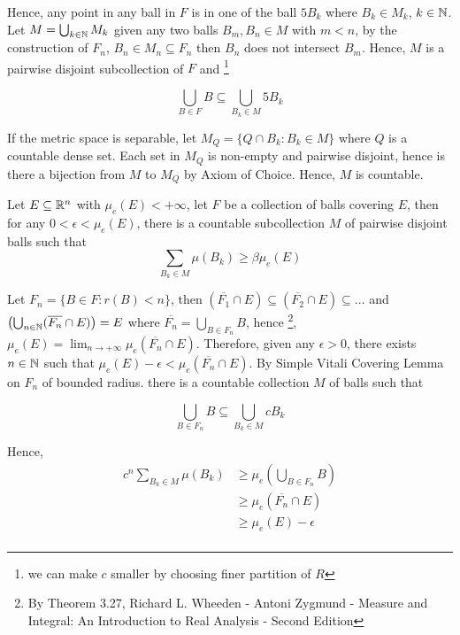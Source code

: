 \documentclass{report}
\begin{document}
Hence, any point in any ball in $F$ is in one of the ball $5 B_k $ where $B_k \in M_k$, $k \in \mathbb{N}$. Let $M = \bigcup_{k \in \mathbb{N}} M_k$ given any two balls $B_m, B_n \in M$ with $m < n$, by the construction of $F_n$, $B_n \in M_n \subseteq F_n$ then $B_n$ does not intersect $B_m$. Hence, $M$ is a pairwise disjoint subcollection of $F$ and \footnote{we can make $c$ smaller by choosing finer partition of $R$}

\[
    \bigcup_{B \in F} B \subseteq \bigcup_{B_k \in M} 5B_k
\]

If the metric space is separable, let $M_Q = \{ Q \cap B_k: B_k \in M \}$ where $Q$ is a countable dense set. Each set in $M_Q$ is non-empty and pairwise disjoint, hence is there a bijection from $M$ to $M_Q$ by Axiom of Choice. Hence, $M$ is countable.

\begin{lemma}
    Let $E \subseteq \mathbb{R}^n$ with $\mu_e(E) < +\infty$, let $F$ be a collection of balls covering $E$, then for any $0 < \epsilon < \mu_e(E)$, there is a countable subcollection $M$ of pairwise disjoint balls such that
    \[
        \sum_{B_k \in M} \mu(B_k) \geq \beta \mu_e(E)
    \]

    
\end{lemma}
Let $F_n = \{B \in F: r(B) < n\}$, then $(\overline{F_1} \cap E) \subseteq (\overline{F_2} \cap E) \subseteq ...$ and $\left( \bigcup_{n \in \mathbb{N}} (\overline{F_n} \cap E) \right) = E$ where $\overline{F_n} = \bigcup_{B \in F_n} B$, hence \footnote{By Theorem 3.27, Richard L. Wheeden - Antoni Zygmund - Measure and Integral: An Introduction to Real Analysis - Second Edition}, $\mu_e(E) = \lim_{n \to +\infty} \mu_e(\overline{F_n} \cap E)$. Therefore, given any $\epsilon > 0$, there exists $n \in \mathbb{N}$ such that $\mu_e(E) - \epsilon < \mu_e(\overline{F_n} \cap E)$. By Simple Vitali Covering Lemma on $F_n$ of bounded radius. there is a countable collection $M$ of balls such that

\[
    \bigcup_{B \in F_n} B \subseteq \bigcup_{B_k \in M} cB_k
\]

Hence, 
\begin{align*}
    c^n \sum_{B_k \in M} \mu(B_k)
    &\geq \mu_e\left(\bigcup_{B \in F_n} B \right) \\
    &\geq \mu_e(\overline{F_n} \cap E) \\
    &\geq \mu_e(E) - \epsilon \\
\end{align*}
\end{document}
